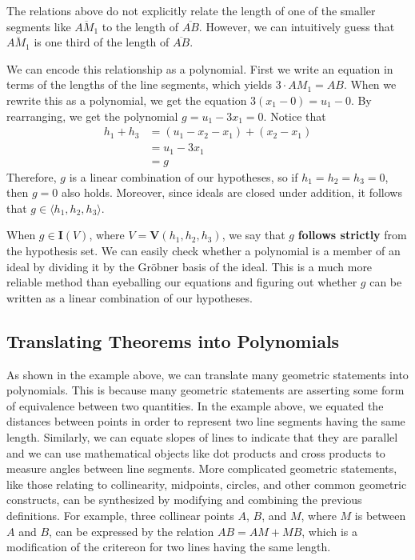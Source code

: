 \documentclass[12pt]{article}
\theoremstyle{plain}
\theoremstyle{definition}
\theoremstyle{remark}
\newcommand{\gro}{Gr\"obner }
\begin{document}
The relations above do not explicitly relate the length of one of the smaller segments like $\overline{AM_1}$ to the length of $\overline{AB}$. 
However, we can intuitively guess that $\overline{AM_1}$ is one third of the length of $\overline{AB}$. 

We can encode this relationship as a polynomial. First we write an equation in terms of the lengths of the line segments, which yields $3\cdot AM_1 = AB$.
When we rewrite this as a polynomial, we get the equation $3 (x_1 - 0) = u_1 - 0$. By rearranging, we get the polynomial $g = u_1 - 3x_1 = 0$.
Notice that
\begin{align*}
    h_1 + h_3 & = (u_1 - x_2 - x_1) + (x_2 - x_1)\\
              & = u_1 - 3x_1\\
              & = g
\end{align*}
Therefore, $g$ is a linear combination of our hypotheses, so if $h_1 = h_2 = h_3 = 0$, then $g = 0$ also holds.
Moreover, since ideals are closed under addition, it follows that $g \in \langle h_1,h_2,h_3 \rangle$.

When $g \in \textbf{I}(V)$, where $V = \textbf{V}(h_1,h_2,h_3)$, we say that $g$ \textbf{follows strictly} from the hypothesis set.
We can easily check whether a polynomial is a member of an ideal by dividing it by the \gro basis of the ideal.
This is a much more reliable method than eyeballing our equations and figuring out whether $g$ can be written as a linear combination of our hypotheses.

\subsection{Translating Theorems into Polynomials}
As shown in the example above, we can translate many geometric statements into polynomials. 
This is because many geometric statements are asserting some form of equivalence between two quantities.
In the example above, we equated the distances between points in order to represent two line segments having the same length.
Similarly, we can equate slopes of lines to indicate that they are parallel and we can use mathematical objects like dot products and cross products to measure angles between line segments.
More complicated geometric statements, like those relating to collinearity, midpoints, circles, and other common geometric constructs, 
can be synthesized by modifying and combining the previous definitions.
For example, three collinear points $A$, $B$, and $M$, where $M$ is between $A$ and $B$, 
can be expressed by the relation $AB = AM + MB$, which is a modification of the critereon for two lines having the same length.
\end{document}
